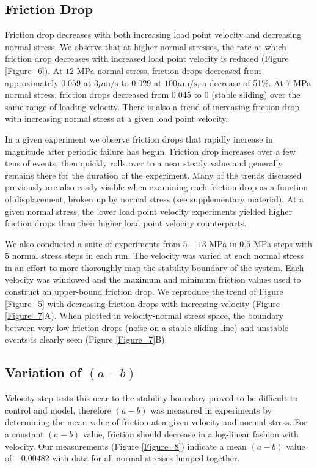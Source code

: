 \subsection{Friction Drop}
Friction drop decreases with both increasing load point velocity and decreasing normal stress. We observe that at higher normal stresses, the rate at which friction drop decreases with increased load point velocity is reduced (Figure \ref{Figure_6}). At $12$ MPa normal stress, friction drops decreased from approximately $0.059$ at $3 \mu\text{m/s}$ to $0.029$ at $100 \mu\text{m/s}$, a decrease of 51\%. At 7 MPa normal stress, friction drops decreased from 0.045 to 0 (stable sliding) over the same range of loading velocity. There is also a trend of increasing friction drop with increasing normal stress at a given load point velocity.

In a given experiment we observe friction drops that rapidly increase in magnitude after periodic failure has begun. Friction drop increases over a few tens of events, then quickly rolls over to a near steady value and generally remains there for the duration of the experiment. Many of the trends discussed previously are also easily visible when examining each friction drop as a function of displacement, broken up by normal stress (see supplementary material). At a given normal stress, the lower load point velocity experiments yielded higher friction drops than their higher load point velocity counterparts. 

We also conducted a suite of experiments from $5-13$ MPa in $0.5$ MPa steps with $5$ normal stress steps in each run. The velocity was varied at each normal stress in an effort to more thoroughly map the stability boundary of the system. Each velocity was windowed and the maximum and minimum friction values used to construct an upper-bound friction drop. We reproduce the trend of Figure \ref{Figure_5} with decreasing friction drops with increasing velocity (Figure \ref{Figure_7}A). When plotted in velocity-normal stress space, the boundary between very low friction drops (noise on a stable sliding line) and unstable events is clearly seen (Figure \ref{Figure_7}B).

\subsection{Variation of $(a-b)$}
Velocity step tests this near to the stability boundary proved to be difficult to control and model, therefore $(a-b)$ was measured in experiments by determining the mean value of friction at a given velocity and normal stress. For a constant $(a-b)$ value, friction should decrease in a log-linear fashion with velocity. Our measurements (Figure \ref{Figure_8}) indicate a mean $(a-b)$ value of $-0.00482$ with data for all normal stresses lumped together. 

